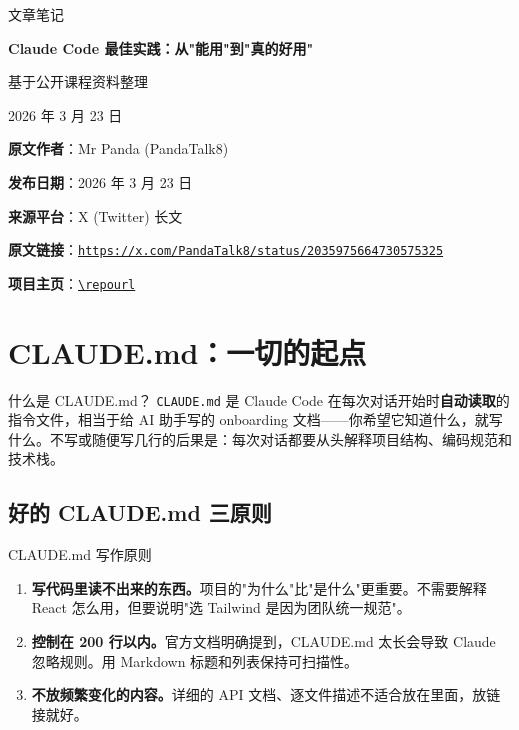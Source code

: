 \documentclass[a4paper]{article}
\newcommand{\notetitle}{Claude Code 最佳实践：从"能用"到"真的好用"}
\newcommand{\noteauthors}{基于公开课程资料整理}
\newcommand{\notedate}{2026 年 3 月 23 日}
\newcommand{\articleauthor}{Mr Panda (PandaTalk8)}
\newcommand{\articlepublishdate}{2026 年 3 月 23 日}
\newcommand{\articleurl}{https://x.com/PandaTalk8/status/2035975664730575325}
\begin{document}
\begin{titlepage}
\centering
{\Large 文章笔记\par}
\vspace{1.2cm}
{\huge\bfseries \notetitle\par}
\vspace{0.8cm}
{\large \noteauthors\par}
\vspace{0.3cm}
{\large \notedate\par}
\vfill
\begin{tcolorbox}[width=0.9\textwidth, colback=black!2!white, colframe=black!60, sharp corners]
\textbf{原文作者}：\articleauthor\par
\textbf{发布日期}：\articlepublishdate\par
\textbf{来源平台}：X (Twitter) 长文\par
\textbf{原文链接}：\href{\articleurl}{\nolinkurl{\articleurl}}\par
\textbf{项目主页}：\href{\repourl}{\nolinkurl{\repourl}}\par
\end{tcolorbox}
\end{titlepage}

\tableofcontents
\newpage


\section{CLAUDE.md：一切的起点}

\begin{knowledgebox}{什么是 CLAUDE.md？}
\texttt{CLAUDE.md} 是 Claude Code 在每次对话开始时\textbf{自动读取}的指令文件，相当于给 AI 助手写的 onboarding 文档——你希望它知道什么，就写什么。不写或随便写几行的后果是：每次对话都要从头解释项目结构、编码规范和技术栈。
\end{knowledgebox}

\subsection{好的 CLAUDE.md 三原则}

\begin{importantbox}{CLAUDE.md 写作原则}
\begin{enumerate}[leftmargin=1.5em]
  \item \textbf{写代码里读不出来的东西。}项目的"为什么"比"是什么"更重要。不需要解释 React 怎么用，但要说明"选 Tailwind 是因为团队统一规范"。
  \item \textbf{控制在 200 行以内。}官方文档明确提到，CLAUDE.md 太长会导致 Claude 忽略规则。用 Markdown 标题和列表保持可扫描性。
  \item \textbf{不放频繁变化的内容。}详细的 API 文档、逐文件描述不适合放在里面，放链接就好。
\end{enumerate}
\end{importantbox}
\end{document}

